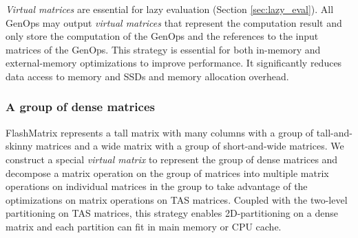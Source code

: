 \textit{Virtual matrices} are essential for lazy evaluation (Section
\ref{sec:lazy_eval}). All GenOps may output \textit{virtual matrices} that
represent the computation result and only store the computation of the GenOps
and the references to the input matrices of the GenOps. This strategy is
essential for both in-memory and external-memory optimizations to improve
performance. It significantly reduces data access to memory and SSDs and
memory allocation overhead.




\subsubsection{A group of dense matrices} \label{sec:mat_group}
FlashMatrix represents a tall matrix with many columns with a group of
tall-and-skinny matrices and a wide matrix with a group of short-and-wide
matrices. We construct a special \textit{virtual matrix} to represent
the group of dense matrices and decompose a matrix operation on the group of
matrices into multiple matrix operations on individual matrices in the group to
take advantage of the optimizations on matrix operations on TAS matrices.
Coupled with the two-level partitioning on TAS matrices, this strategy enables
2D-partitioning on a dense matrix and each partition can fit in main memory
or CPU cache.

